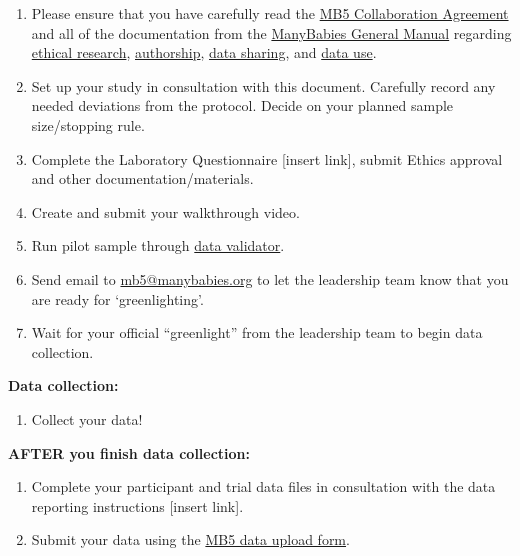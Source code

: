 \documentclass[
]{book}
\providecommand{\tightlist}{%
  \setlength{\itemsep}{0pt}\setlength{\parskip}{0pt}}
\theoremstyle{definition}
\theoremstyle{definition}
\theoremstyle{definition}
\theoremstyle{definition}
\theoremstyle{remark}
\begin{document}
\begin{enumerate}
\def\labelenumi{\arabic{enumi}.}
\setcounter{enumi}{2}
\tightlist
\item
  Please ensure that you have carefully read the \href{https://docs.google.com/document/d/1vbTDmH6euda5pJN4uyds3zsnQ1DXrW9wpHogwC-5TSk/edit?usp=sharing}{MB5 Collaboration Agreement} and all of the documentation from the \href{https://docs.google.com/document/d/1dZ3sF2UcxvpkfOfKSKFeObTMZRbpUYloMUiPYtZy0ng/edit?usp=sharing}{ManyBabies General Manual} regarding \href{https://docs.google.com/document/d/1dZ3sF2UcxvpkfOfKSKFeObTMZRbpUYloMUiPYtZy0ng/edit\#heading=h.22i70rxou3ha}{ethical research}, \href{https://docs.google.com/document/d/1dZ3sF2UcxvpkfOfKSKFeObTMZRbpUYloMUiPYtZy0ng/edit\#heading=h.9ty2g48mpe0t}{authorship}, \href{https://docs.google.com/document/d/1dZ3sF2UcxvpkfOfKSKFeObTMZRbpUYloMUiPYtZy0ng/edit\#heading=h.aunbjkpwxhf3}{data sharing}, and \href{https://docs.google.com/document/d/1dZ3sF2UcxvpkfOfKSKFeObTMZRbpUYloMUiPYtZy0ng/edit\#heading=h.6h67zsyeiveg}{data use}.
\item
  Set up your study in consultation with this document. Carefully record any needed deviations from the protocol. Decide on your planned sample size/stopping rule.
\item
  Complete the Laboratory Questionnaire {[}insert link{]}, submit Ethics approval and other documentation/materials.
\item
  Create and submit your walkthrough video.
\item
  Run pilot sample through \href{https://manybabies.org/validator/}{data validator}.
\item
  Send email to \url{mb5@manybabies.org} to let the leadership team know that you are ready for `greenlighting'.
\item
  Wait for your official ``greenlight'' from the leadership team to begin data collection.
\end{enumerate}

\textbf{Data collection:}

\begin{enumerate}
\def\labelenumi{\arabic{enumi}.}
\setcounter{enumi}{9}
\tightlist
\item
  Collect your data!
\end{enumerate}

\textbf{AFTER you finish data collection:}

\begin{enumerate}
\def\labelenumi{\arabic{enumi}.}
\setcounter{enumi}{10}
\tightlist
\item
  Complete your participant and trial data files in consultation with the data reporting instructions {[}insert link{]}.
\item
  Submit your data using the \href{https://docs.google.com/forms/d/e/1FAIpQLSdFYk-gb4yjRYLjSTP1_BVaW-3vLkpJClLoY2BOGDGfIVE5ww/viewform?usp=sf_link}{MB5 data upload form}.
\end{enumerate}
\end{document}
